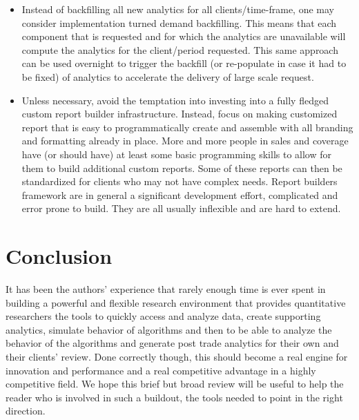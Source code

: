 \begin{itemize}
\item Instead of backfilling all new analytics for all clients/time-frame, one may consider implementation turned demand backfilling. This means that each component that is requested and for which the analytics are unavailable will compute the analytics for the client/period requested. This same approach can be used overnight to trigger the backfill  (or re-populate in case it had to be fixed) of analytics to accelerate the delivery of large scale request.

\item Unless necessary, avoid the temptation into investing into a fully fledged custom report builder infrastructure. Instead, focus on making customized report that is easy to programmatically create and assemble with all branding and formatting already in place. More and more people in sales and coverage have (or should have) at least some basic programming skills to allow for them to build additional custom reports. Some of these reports can then be standardized for clients who may not have complex needs. Report builders framework are in general a significant development effort, complicated and error prone to build. They are all usually inflexible and are hard to extend. 
\end{itemize}

 

\section{Conclusion}

It has been the authors' experience that rarely enough time is ever spent in building a powerful and flexible research environment that provides quantitative researchers the tools to quickly access and analyze data, create supporting analytics, simulate behavior of algorithms and then to be able to analyze the behavior of the algorithms and generate post trade analytics for their own and their clients' review. Done correctly though, this should become a real engine for innovation and performance and a real competitive advantage in a highly competitive field. We hope this brief but broad review will be useful to help the reader who is involved in such a buildout, the tools needed to point in the right direction.
